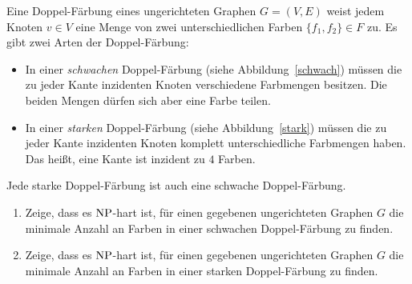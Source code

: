 \documentclass{uebung_cs}
\begin{document}
\begin{exercise}[Doppel-Färbung]
	Eine Doppel-Färbung eines ungerichteten Graphen $G = (V,E)$ weist jedem Knoten $v \in V$ eine Menge von zwei unterschiedlichen Farben $\{f_1,f_2\} \in F$ zu. Es gibt zwei Arten der Doppel-Färbung:
	\begin{itemize}
		\item In einer \textit{schwachen} Doppel-Färbung (siehe Abbildung~\ref{schwach}) müssen die zu jeder Kante inzidenten Knoten verschiedene Farbmengen besitzen. Die beiden Mengen dürfen sich aber eine Farbe teilen.
		\item In einer \textit{starken} Doppel-Färbung (siehe Abbildung~\ref{stark}) müssen die zu jeder Kante inzidenten Knoten komplett unterschiedliche Farbmengen haben. Das heißt, eine Kante ist inzident zu $4$ Farben.
	\end{itemize}
	Jede starke Doppel-Färbung ist auch eine schwache Doppel-Färbung.
	\begin{enumerate}
		\item Zeige, dass es $\mathrm{NP}$-hart ist, für einen gegebenen ungerichteten Graphen $G$ die minimale Anzahl an Farben in einer schwachen Doppel-Färbung zu finden.
		\item Zeige, dass es $\mathrm{NP}$-hart ist, für einen gegebenen ungerichteten Graphen $G$ die minimale Anzahl an Farben in einer starken Doppel-Färbung zu finden.
	\end{enumerate}
	\begin{figure}[ht]
	    \begin{minipage}{0.5\linewidth}
	        \centering
\end{minipage}
\end{figure}
\end{exercise}
\end{document}
